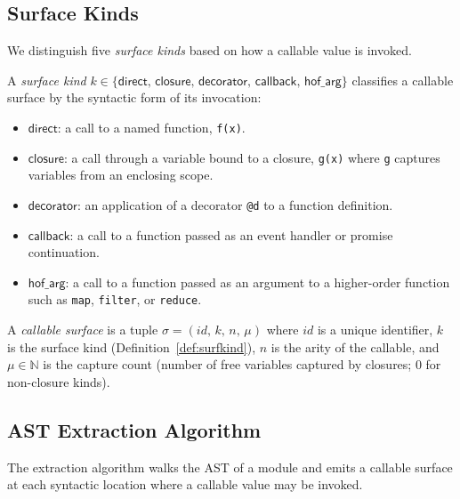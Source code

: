 \documentclass[11pt]{article}
\newcommand{\surf}{\sigma}                     %
\newcommand{\MapF}{\texttt{map}}               %
\newcommand{\FilterF}{\texttt{filter}}         %
\newcommand{\ReduceF}{\texttt{reduce}}         %
\begin{document}
\subsection{Surface Kinds}

We distinguish five \emph{surface kinds} based on how a callable
value is invoked.

\begin{definition}\label{def:surfkind}
A \emph{surface kind} $k \in \{\mathsf{direct},\, \mathsf{closure},\,
\mathsf{decorator},\, \mathsf{callback},\, \mathsf{hof\_arg}\}$
classifies a callable surface by the syntactic form of its invocation:
\begin{itemize}
  \item $\mathsf{direct}$: a call to a named function,
        \texttt{f(x)}.
  \item $\mathsf{closure}$: a call through a variable bound to a
        closure, \texttt{g(x)} where \texttt{g} captures variables
        from an enclosing scope.
  \item $\mathsf{decorator}$: an application of a decorator
        \texttt{@d} to a function definition.
  \item $\mathsf{callback}$: a call to a function passed as an
        event handler or promise continuation.
  \item $\mathsf{hof\_arg}$: a call to a function passed as an
        argument to a higher-order function such as \MapF{},
        \FilterF{}, or \ReduceF{}.
\end{itemize}
\end{definition}

\begin{definition}\label{def:surface}
A \emph{callable surface} is a tuple
$\surf = (\mathit{id},\, k,\, n,\, \mu)$ where
$\mathit{id}$ is a unique identifier,
$k$ is the surface kind (Definition~\ref{def:surfkind}),
$n$ is the arity of the callable,
and $\mu \in \mathbb{N}$ is the capture count (number of free
variables captured by closures; $0$ for non-closure kinds).
\end{definition}

\subsection{AST Extraction Algorithm}

The extraction algorithm walks the AST of a \Python{} module and
emits a callable surface at each syntactic location where a callable
value may be invoked.
\end{document}
